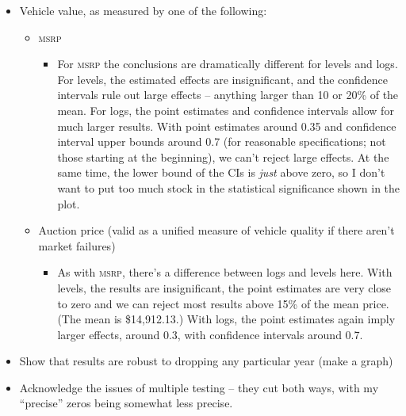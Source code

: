 \documentclass[11pt,letterpaper,oneside]{article}
\newcommand{\msrp}{\textsc{msrp}}
\begin{document}
\begin{itemize}
\begin{itemize}
\begin{itemize}
        \end{itemize}
        \item Vehicle value, as measured by one of the following:
        \begin{itemize}
            \item \msrp{}
            \begin{itemize}
                \item  For \msrp{} the conclusions are dramatically different for levels and logs.
                    For levels, the estimated effects are insignificant, and the confidence intervals rule out large effects -- anything larger than 10 or 20\% of the mean.
                    For logs, the point estimates and confidence intervals allow for much larger results.
                    With point estimates around 0.35 and confidence interval upper bounds around 0.7 (for reasonable specifications; not those starting at the beginning), we can't reject large effects.
                    At the same time, the lower bound of the CIs is \emph{just} above zero, so I don't want to put too much stock in the statistical significance shown in the plot.
            \end{itemize}
            \item Auction price (valid as a unified measure of vehicle quality if there aren't market failures)
            \begin{itemize}
                \item  As with \textsc{msrp}, there's a difference between logs and levels here.  With levels, the results are insignificant, the point estimates are very close to zero and we can reject most results above 15\% of the mean price.  (The mean is \$14,912.13.)
                With logs, the point estimates again imply larger effects, around 0.3, with confidence intervals around 0.7.
            \end{itemize}
        \end{itemize}
        \item Show that results are robust to dropping any particular year (make a graph)
        \item Acknowledge the issues of multiple testing -- they cut both ways, with my ``precise'' zeros being somewhat less precise.
    \end{itemize}



\end{itemize}
\end{document}
